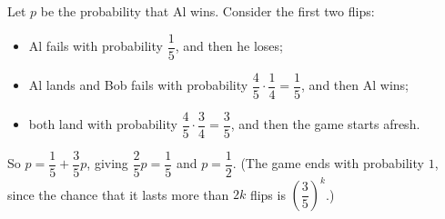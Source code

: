 Let $p$ be the probability that Al wins. Consider the first two flips:
\begin{itemize}
\item Al fails with probability $\dfrac15$, and then he loses;
\item Al lands and Bob fails with probability $\dfrac45\cdot\dfrac14=\dfrac15$, and then Al wins;
\item both land with probability $\dfrac45\cdot\dfrac34=\dfrac35$, and then the game starts afresh.
\end{itemize}
So $p=\dfrac15+\dfrac35p$, giving $\dfrac25p=\dfrac15$ and $p=\boxed{\dfrac12}$. (The game ends with probability $1$, since the chance that it lasts more than $2k$ flips is $\left(\dfrac35\right)^k$.)
